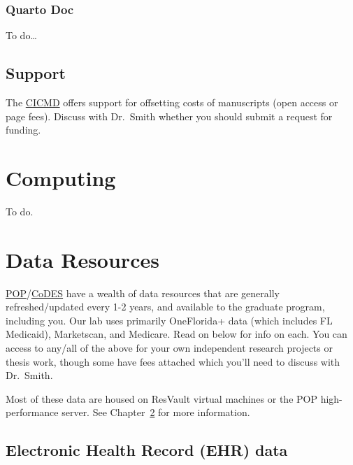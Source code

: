 \documentclass[
  letterpaper,
  DIV=11,
  numbers=noendperiod]{scrreprt}
\begin{document}
\hypertarget{quarto-doc}{%
\subsection{Quarto Doc}\label{quarto-doc}}

To do\ldots{}

\hypertarget{support}{%
\section{Support}\label{support}}

The \href{https://cicmd.center.ufl.edu/}{CICMD} offers support for
offsetting costs of manuscripts (open access or page fees). Discuss with
Dr.~Smith whether you should submit a request for funding.


\hypertarget{sec-computing}{%
\chapter{Computing}\label{sec-computing}}

To do.


\hypertarget{sec-data}{%
\chapter{Data Resources}\label{sec-data}}

\href{https://pop.pharmacy.ufl.edu/}{POP}/\href{https://codes.pharmacy.ufl.edu/}{CoDES}
have a wealth of data resources that are generally refreshed/updated
every 1-2 years, and available to the graduate program, including you.
Our lab uses primarily OneFlorida+ data (which includes FL Medicaid),
Marketscan, and Medicare. Read on below for info on each. You can access
to any/all of the above for your own independent research projects or
thesis work, though some have fees attached which you'll need to discuss
with Dr.~Smith.

Most of these data are housed on ResVault virtual machines or the POP
high-performance server. See Chapter~\ref{sec-computing} for more
information.

\hypertarget{electronic-health-record-ehr-data}{%
\section{Electronic Health Record (EHR)
data}\label{electronic-health-record-ehr-data}}
\end{document}

